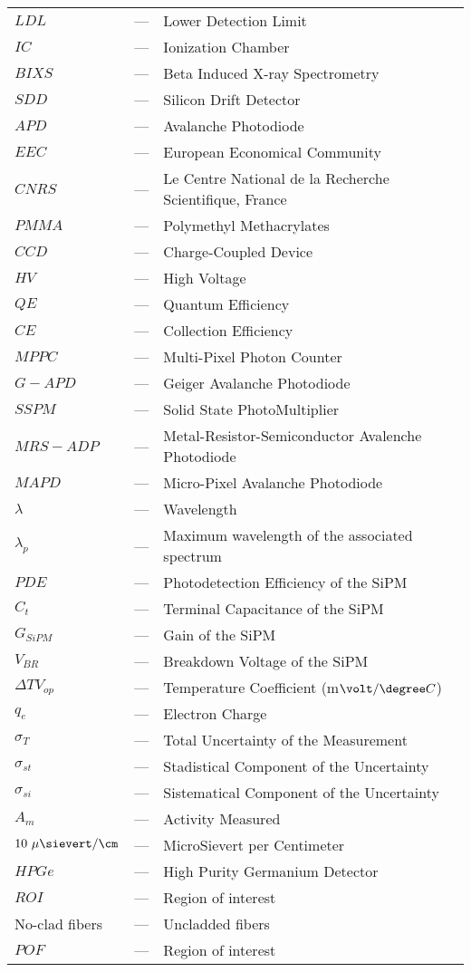 \begin{longtable}{p{25mm} c p{120mm} }
$LDL$ & --- & Lower Detection Limit\\
$IC$ & --- & Ionization Chamber\\
$BIXS$ & --- & Beta Induced X-ray Spectrometry\\
$SDD$ & --- & Silicon Drift Detector\\
$APD$ & --- & Avalanche Photodiode\\
$EEC$ & --- & European Economical Community\\
$CNRS$ & --- & Le Centre National de la Recherche Scientifique, France\\
$PMMA$ & --- & Polymethyl Methacrylates\\
$CCD$ & --- & Charge-Coupled Device\\
$HV$ & --- & High Voltage\\
$QE$ & --- & Quantum Efficiency\\
$CE$ & --- & Collection Efficiency\\
$MPPC$ & --- & Multi-Pixel Photon Counter\\
$G-APD$ & --- & Geiger Avalanche Photodiode\\
$SSPM$ & --- & Solid State PhotoMultiplier\\
$MRS-ADP$ & --- & Metal-Resistor-Semiconductor Avalenche Photodiode\\
$MAPD$ & --- & Micro-Pixel Avalanche Photodiode\\
$\lambda$ & --- & Wavelength\\
$\lambda_p$ & --- & Maximum wavelength of the
\newline associated spectrum\\
$PDE$ & --- & Photodetection Efficiency of the SiPM\\
$C_t$ & --- & Terminal Capacitance of the SiPM\\
$G_{SiPM}$ & --- & Gain of the SiPM\\
$V_{BR}$ & --- & Breakdown Voltage of the SiPM\\
$\Delta TV_{op}$ & --- & Temperature Coefficient (m$\volt/\degree C$)\\
$q_{e}$ & --- & Electron Charge\\
$\sigma_{T}$ & --- & Total Uncertainty of the Measurement\\
$\sigma_{st}$ & --- & Stadistical Component of the Uncertainty\\
$\sigma_{si}$ & --- & Sistematical Component of the Uncertainty\\
$A_{m}$ & --- & Activity Measured\\
$10~\mu\sievert/\cm$ & --- & MicroSievert per Centimeter\\
$HPGe$ & --- & High Purity Germanium Detector\\
$ROI$ & --- & Region of interest\\
No-clad fibers & --- & Uncladded fibers\\
$POF$ & --- & Region of interest\\



\end{longtable}
